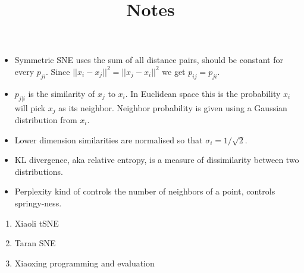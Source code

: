 \documentclass[12pt]{article}
\title{Notes}
\author{}
\date{}
\begin{document}
\maketitle

\begin{itemize}
\item Symmetric SNE uses the sum of all distance pairs, should be
  constant for every $p_{ji}$.
  Since $|| x_i - x_j ||^2 = || x_j - x_i ||^2$ we get $p_{ij} = p_{ji}$.

\item $p_{j|i}$ is the similarity of $x_j$ to $x_i$.
  In Euclidean space this is the probability $x_i$ will pick $x_j$ as
  its neighbor.
  Neighbor probability is given using a Gaussian distribution from
  $x_i$.

\item Lower dimension similarities are normalised so that $\sigma_i = 1/\sqrt{2}$.

\item KL divergence, aka relative entropy, is a measure of
  dissimilarity between two distributions.

\item Perplexity kind of controls the number of neighbors of a point,
  controls springy-ness.
\end{itemize}

\begin{enumerate}
\item Xiaoli tSNE
\item Taran SNE
\item Xiaoxing programming and evaluation
\end{enumerate}
\end{document}

